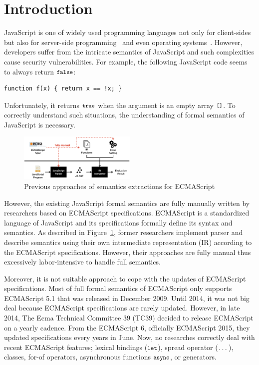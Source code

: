 \section{Introduction}

JavaScript is one of widely used programming languages not only for client-sides
but also for server-side programming~\cite{???} and even operating systems~\cite{???}.
However, developers suffer from the intricate semantics of JavaScript and
such complexities cause security vulnerabilities. For example, the following JavaScript
code seems to always return \( \texttt{\small false} \):
\begin{lstlisting}[style=myJSstyle]
function f(x) { return x == !x; }
\end{lstlisting}
Unfortunately, it returns \( \texttt{\small true} \) when the argument is an empty array
\( \texttt{\small[]} \). To correctly understand such situations, the understanding of
formal semantics of JavaScript is necessary.

\begin{figure}
  \centering
  \includegraphics[width=0.5\textwidth]{img/previous.png}
  \caption{Previous approaches of semantics extractions for ECMAScript}
  \label{fig:previous}
\end{figure}

However, the existing JavaScript formal semantics are fully manually written
by researchers based on ECMAScript specifications. ECMAScript is a standardized language
of JavaScript and its specifications formally define its syntax and semantics.
As described in Figure~\ref{fig:previous}, former researchers implement parser and
describe semantics using their own intermediate representation (IR) according to the ECMAScript
specifications. However, their approaches are fully manual thus excessively labor-intensive
to handle full semantics.

Moreover, it is not suitable approach to cope with the updates of ECMAScript specifications.
Most of full formal semantics of ECMAScript only supports ECMAScript 5.1 that was
released in December 2009. Until 2014, it was not big deal because ECMAScript
specifications are rarely updated. However, in late 2014, The Ecma Technical
Committee 39 (TC39) decided to release ECMAScript on a yearly cadence. From the
ECMAScript 6, officially ECMAScript 2015, they updated specifications every years
in June. Now, no researches correctly deal with recent ECMAScript features;
lexical bindings (\( \texttt{\small let} \)), spread operator (\( \texttt{\small...} \)),
classes, for-of operators, asynchronous functions \( \texttt{\small async} \), or generators.

